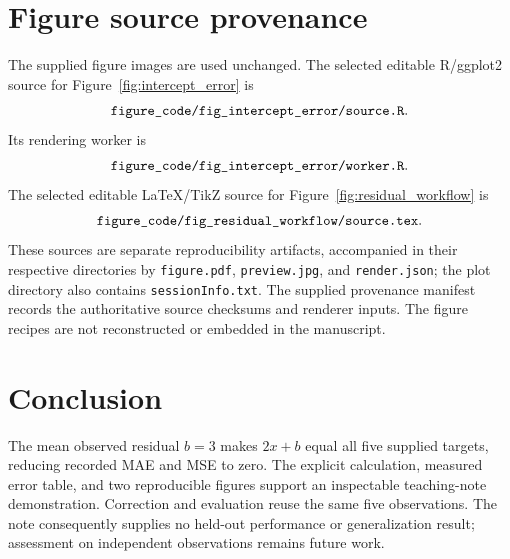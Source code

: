 \documentclass[11pt]{article}
\begin{document}
\section*{Figure source provenance}

The supplied figure images are used unchanged. The selected editable R/ggplot2 source for Figure~\ref{fig:intercept_error} is
\[
\text{\texttt{\detokenize{figure_code/fig_intercept_error/source.R}}}.
\]
Its rendering worker is
\[
\text{\texttt{\detokenize{figure_code/fig_intercept_error/worker.R}}}.
\]
The selected editable LaTeX/TikZ source for Figure~\ref{fig:residual_workflow} is
\[
\text{\texttt{\detokenize{figure_code/fig_residual_workflow/source.tex}}}.
\]
These sources are separate reproducibility artifacts, accompanied in their respective directories by \texttt{figure.pdf}, \texttt{preview.jpg}, and \texttt{render.json}; the plot directory also contains \texttt{sessionInfo.txt}. The supplied provenance manifest records the authoritative source checksums and renderer inputs. The figure recipes are not reconstructed or embedded in the manuscript.

\clearpage
\section{Conclusion}

The mean observed residual $b=3$ makes $2x+b$ equal all five supplied targets, reducing recorded MAE and MSE to zero. The explicit calculation, measured error table, and two reproducible figures support an inspectable teaching-note demonstration. Correction and evaluation reuse the same five observations. The note consequently supplies no held-out performance or generalization result; assessment on independent observations remains future work.




\clearpage
\end{document}
